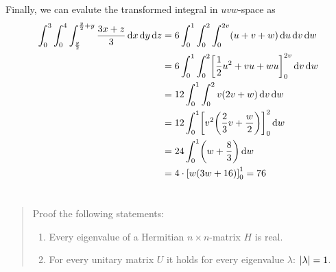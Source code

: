 \documentclass{exercise}
\begin{document}
	Finally, we can evalute the transformed integral in \(uvw\)-space as
	\begin{align*}
		\int_0^3 \int_0^4 \int_{\frac{y}{2}}^{\frac{y}{2} + y}\frac{3x + z}{3}\d x\d y\d z &= 6\int_0^1 \int_0^2 \int_0^{2v}\parentheses*{u + v + w}\d u\d v\d w\\
		&= 6\int_0^1 \int_0^2 \brackets*{\frac{1}{2}u^2 + vu + wu}_0^{2v}\d v\d w\\
		&= 12\int_0^1 \int_0^2 v\parentheses*{2v + w}\d v\d w\\
		&= 12\int_0^1 \brackets*{v^2\parentheses*{\frac{2}{3}v + \frac{w}{2}}}_0^2 \d w\\
		&= 24\int_0^1 \parentheses*{w + \frac{8}{3}}\d w\\
		&= 4 \cdot \brackets*{w\parentheses*{3w + 16}}_0^1 = 76
	\end{align*}


	\section{}

	\begin{quote}
		Proof the following statements:
		\begin{enumerate}
			\item Every eigenvalue of a Hermitian \(n \times n\)-matrix \(H\) is real.
			\item For every unitary matrix \(U\) it holds for every eigenvalue \(\lambda\): \(\absolute*{\lambda} = 1\).
		\end{enumerate}
	\end{quote}
\end{document}
